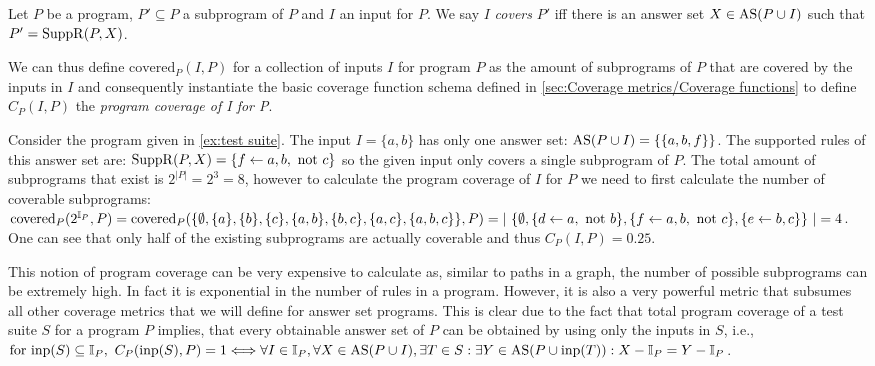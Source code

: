 \begin{definition}
\label{def:program coverage}
    Let $P$ be a program, \(P' \subseteq P\) a subprogram of $P$ and $I$ an input for $P$. We say $I$ \emph{covers} $P'$ iff there is an answer set \(X \in \operatorname{AS}(P \cup I)\) such that \(P' = \operatorname{SuppR}(P, X)\).
\end{definition}

We can thus define \(\text{covered}_P(I, P)\) for a collection of inputs $I$ for program $P$ as the amount of subprograms of $P$ that are covered by the inputs in $I$ and consequently instantiate the basic coverage function schema defined in \cref{sec:Coverage metrics/Coverage functions} to define \(C_P(I, P)\) the \emph{program coverage of I for P}.

\begin{example}
\label{ex:program coverage}
    Consider the program given in \cref{ex:test suite}. The input \(I = \{a, b\}\) has only one answer set: \(\operatorname{AS}(P \cup I) = \{\{a, b, f\}\}\). The supported rules of this answer set are: \(\SuppR(P, X) = \{f \leftarrow a, b,\ \text{not}\ c\}\) so the given input only covers a single subprogram of $P$. The total amount of subprograms that exist is \(2^{|P|} = 2^3 = 8\), however to calculate the program coverage of $I$ for $P$ we need to first calculate the number of coverable subprograms: \(\text{covered}_P(2^{\mathbb{I}_P},P) = \text{covered}_P(\{\emptyset, \{a\}, \{b\}, \{c\}, \{a, b\}, \{b, c\}, \{a, c\}, \\ \{a, b, c\}\},P) = |\ \{\emptyset, \{d \leftarrow a,\ \text{not}\ b\}, \{f \leftarrow a, b,\ \text{not}\ c\}, \{e \leftarrow b, c\}\}\ | = 4\). One can see that only half of the existing subprograms are actually coverable and thus \(C_P(I, P) = 0.25\).
\end{example}

This notion of program coverage can be very expensive to calculate as, similar to paths in a graph, the number of possible subprograms can be extremely high. In fact it is exponential in the number of rules in a program. However, it is also a very powerful metric that subsumes all other coverage metrics that we will define for answer set programs. This is clear due to the fact that total program coverage of a test suite $S$ for a program $P$ implies, that every obtainable answer set of $P$ can be obtained by using only the inputs in $S$, i.e., 
\(
    \text{for inp}(S) \subseteq \mathbb{I}_P,\ C_P(\operatorname{inp}(S),P) = 1 \Longleftrightarrow \forall I \in \mathbb{I}_P, \forall X \in \operatorname{AS}(P \cup I), \exists T \in S: \exists Y \in \operatorname{AS}(P \cup \operatorname{inp}(T)) : X - \mathbb{I}_P = Y - \mathbb{I}_P
\).


